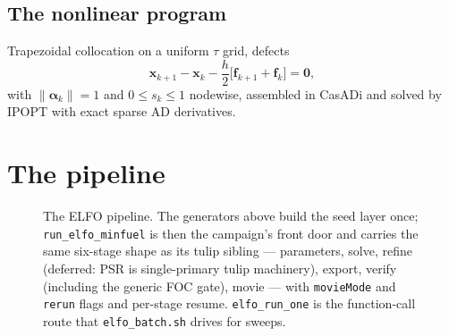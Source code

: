 \documentclass[11pt]{article}
\newcommand{\vect}[1]{\bm{#1}}
\newcommand{\file}[1]{\texttt{#1}}
\begin{document}
\subsection{The nonlinear program}

Trapezoidal collocation on a uniform $\tau$ grid, defects
\begin{equation}
\vect{x}_{k+1}-\vect{x}_k-\frac{h}{2}\big[\vect{f}_{k+1}+\vect{f}_k\big]=\vect{0},
\end{equation}
with $\|\vect{\alpha}_k\|=1$ and $0\le s_k\le1$ nodewise, assembled in CasADi
and solved by IPOPT with exact sparse AD derivatives.

\section{The pipeline}

\begin{figure}[htbp]
\centering
{}
\caption{The ELFO pipeline. The generators above build the seed layer once;
\file{run\_elfo\_minfuel} is then the campaign's front door and carries the
same six-stage shape as its tulip sibling --- parameters, solve, refine
(deferred: PSR is single-primary tulip machinery), export, verify (including
the generic FOC gate), movie --- with \texttt{movieMode} and \texttt{rerun}
flags and per-stage resume. \file{elfo\_run\_one} is the function-call route
that \file{elfo\_batch.sh} drives for sweeps.}
\label{fig:elfopipe}
\end{figure}
\end{document}
